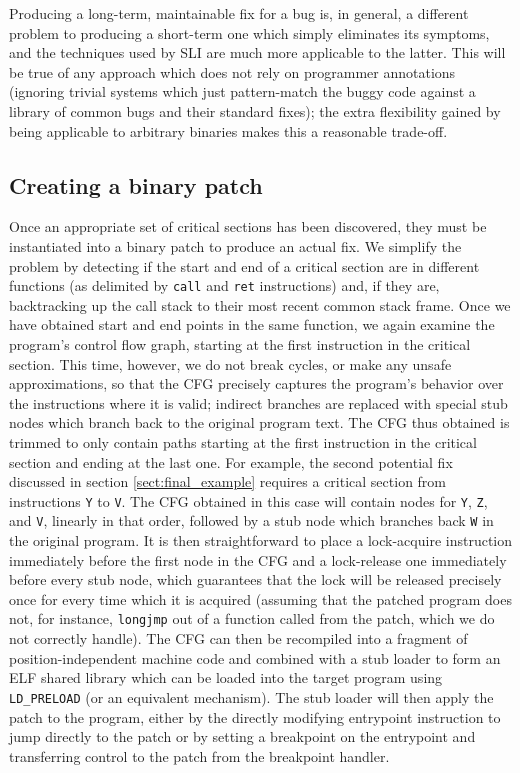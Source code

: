 \documentclass[10pt,twocolumn,preprint,natbib,authoryear]{sigplanconf}
\begin{document}
Producing a long-term, maintainable fix for a bug is, in general, a
different problem to producing a short-term one which simply
eliminates its symptoms, and the techniques used by SLI are much more
applicable to the latter.  This will be true of any approach which
does not rely on programmer annotations (ignoring trivial systems
which just pattern-match the buggy code against a library of common
bugs and their standard fixes); the extra flexibility gained by being
applicable to arbitrary binaries makes this a reasonable trade-off.

\subsection{Creating a binary patch}
\label{sect:binpatch}

Once an appropriate set of critical sections has been discovered, they
must be instantiated into a binary patch to produce an actual fix.  We
simplify the problem by detecting if the start and end of a critical
section are in different functions (as delimited by \verb|call| and
\verb|ret| instructions) and, if they are, backtracking up the call
stack to their most recent common stack frame.  Once we have obtained
start and end points in the same function, we again examine the
program's control flow graph, starting at the first instruction in the
critical section.  This time, however, we do not break cycles, or make
any unsafe approximations, so that the CFG precisely captures the
program's behavior over the instructions where it is valid; indirect
branches are replaced with special stub nodes which branch back to the
original program text.  The CFG thus obtained is trimmed to only
contain paths starting at the first instruction in the critical
section and ending at the last one.  For example, the second potential
fix discussed in section \ref{sect:final_example} requires a critical
section from instructions \verb|Y| to \verb|V|.  The CFG obtained in
this case will contain nodes for \verb|Y|, \verb|Z|, and \verb|V|,
linearly in that order, followed by a stub node which branches back
\verb|W| in the original program.  It is then straightforward to place
a lock-acquire instruction immediately before the first node in the
CFG and a lock-release one immediately before every stub node, which
guarantees that the lock will be released precisely once for every
time which it is acquired (assuming that the patched program does not,
for instance, \verb|longjmp| out of a function called from the patch,
which we do not correctly handle).  The CFG can then be recompiled
into a fragment of position-independent machine code and combined with
a stub loader to form an ELF shared library which can be loaded into
the target program using \verb|LD_PRELOAD| (or an equivalent
mechanism).  The stub loader will then apply the patch to the program,
either by the directly modifying entrypoint instruction to jump
directly to the patch or by setting a breakpoint on the entrypoint and
transferring control to the patch from the breakpoint handler.
\end{document}
